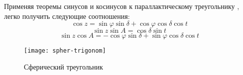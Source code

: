 Применяя теоремы синусов и косинусов к параллактическому треугольнику , легко получить следующие соотношения:
\begin{equation}
\cos z=\sin\varphi\sin\delta+\cos\varphi\cos\delta\cos t
\end{equation}
\begin{equation}
\sin z\sin A=\cos\delta\sin t
\end{equation}
\begin{equation}
\sin z\cos A=-\cos\varphi\sin\delta+\sin\varphi\cos\delta\cos t
\end{equation}

\begin{figure}[!h]
\centering
 \texttt{[image: spher-trigonom]}
 \caption{Сферический треугольник}
\end{figure}




